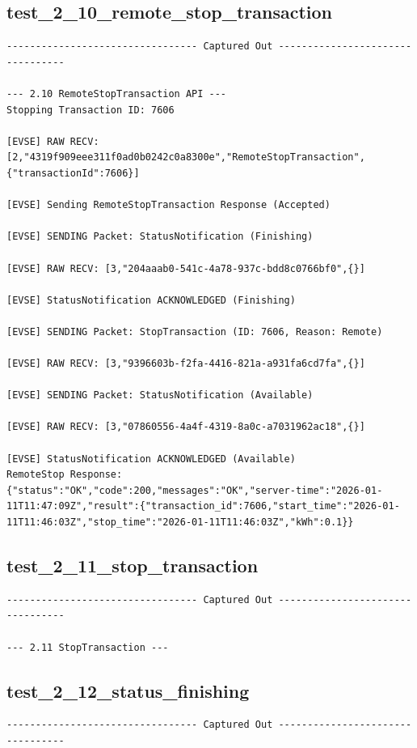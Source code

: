 \documentclass{article}
\begin{document}
\subsection*{test\_2\_10\_remote\_stop\_transaction}
\begin{lstlisting}
--------------------------------- Captured Out ---------------------------------

--- 2.10 RemoteStopTransaction API ---
Stopping Transaction ID: 7606

[EVSE] RAW RECV: [2,"4319f909eee311f0ad0b0242c0a8300e","RemoteStopTransaction",{"transactionId":7606}]

[EVSE] Sending RemoteStopTransaction Response (Accepted)

[EVSE] SENDING Packet: StatusNotification (Finishing)

[EVSE] RAW RECV: [3,"204aaab0-541c-4a78-937c-bdd8c0766bf0",{}]

[EVSE] StatusNotification ACKNOWLEDGED (Finishing)

[EVSE] SENDING Packet: StopTransaction (ID: 7606, Reason: Remote)

[EVSE] RAW RECV: [3,"9396603b-f2fa-4416-821a-a931fa6cd7fa",{}]

[EVSE] SENDING Packet: StatusNotification (Available)

[EVSE] RAW RECV: [3,"07860556-4a4f-4319-8a0c-a7031962ac18",{}]

[EVSE] StatusNotification ACKNOWLEDGED (Available)
RemoteStop Response: {"status":"OK","code":200,"messages":"OK","server-time":"2026-01-11T11:47:09Z","result":{"transaction_id":7606,"start_time":"2026-01-11T11:46:03Z","stop_time":"2026-01-11T11:46:03Z","kWh":0.1}}
\end{lstlisting}
\subsection*{test\_2\_11\_stop\_transaction}
\begin{lstlisting}
--------------------------------- Captured Out ---------------------------------

--- 2.11 StopTransaction ---
\end{lstlisting}
\subsection*{test\_2\_12\_status\_finishing}
\begin{lstlisting}
--------------------------------- Captured Out ---------------------------------
\end{lstlisting}
\end{document}
